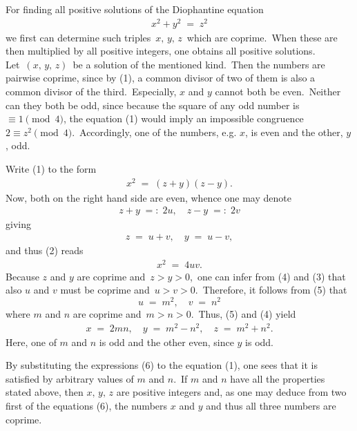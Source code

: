 \documentclass[12pt]{article}
\theoremstyle{definition}
\begin{document}
For finding all positive solutions of the Diophantine equation
\begin{align}
x^2\!+\!y^2 \;=\; z^2
\end{align}
we first can determine such triples\, $x,\,y,\,z$\, which are coprime.\, When these are then multiplied by all positive integers, one obtains all positive solutions.\\

Let\, $(x,\,y,\,z)$\, be a solution of the mentioned kind.\, Then the numbers are pairwise coprime, since by (1), a common divisor of two of them is also a common divisor of the third.\, Especially, $x$ and $y$ cannot both be even.\, Neither can they both be odd, since because the square of any odd number is\, $\equiv 1 \pmod{4}$, the equation (1) would imply an impossible congruence\, $2 \equiv z^2 \pmod{4}$.\, Accordingly, one of the numbers, e.g. $x$, is even and the other, $y$, odd.

Write (1) to the form
\begin{align}
x^2 \;=\; (z\!+\!y)(z\!-\!y).
\end{align}
Now, both  on the right hand side are even, whence one may denote
\begin{align}
z\!+\!y \;=:\; 2u, \quad z\!-\!y \;=:\; 2v
\end{align}
giving
\begin{align}
z \;=\; u\!+\!v, \quad y \;=\; u\!-\!v,
\end{align}
and thus (2) reads
\begin{align}
x^2 \;=\; 4uv.
\end{align}
Because $z$ and $y$ are coprime and\, $z > y > 0$,\, one can infer from (4) and (3) that also $u$ and $v$ must be coprime and\, $u > v > 0$.\, Therefore, it follows from (5) that
$$u \;=\; m^2, \quad v \;=\; n^2$$
where $m$ and $n$ are coprime and\, $m > n > 0$.\, Thus, (5) and (4) yield
\begin{align}
x \;=\; 2mn, \quad y \;=\; m^2\!-\!n^2, \quad z \;=\; m^2\!+\!n^2.
\end{align}
Here, one of $m$ and $n$ is odd and the other even, since $y$ is odd.

By substituting the expressions (6) to the equation (1), one sees that it is satisfied by arbitrary values of $m$ and 
$n$.\, If $m$ and $n$ have all the properties stated above, then $x,\,y,\,z$ are positive integers and, as one may deduce from two first of the equations (6), the numbers $x$ and $y$ and thus all three numbers are coprime.\\
\end{document}
